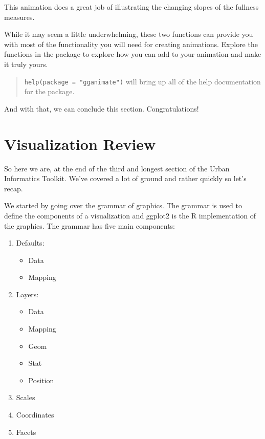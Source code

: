 \documentclass[
]{book}
\providecommand{\tightlist}{%
  \setlength{\itemsep}{0pt}\setlength{\parskip}{0pt}}
\begin{document}
This animation does a great job of illustrating the changing slopes of the fullness measures.

While it may seem a little underwhelming, these two functions can provide you with most of the functionality you will need for creating animations. Explore the functions in the package to explore how you can add to your animation and make it truly yours.

\begin{quote}
\texttt{help(package\ =\ "gganimate")} will bring up all of the help documentation for the package.
\end{quote}

And with that, we can conclude this section. Congratulations!

\hypertarget{visualization-review}{%
\chapter{Visualization Review}\label{visualization-review}}

So here we are, at the end of the third and longest section of the Urban Informatics Toolkit. We've covered a lot of ground and rather quickly so let's recap.

We started by going over the grammar of graphics. The grammar is used to define the components of a visualization and ggplot2 is the R implementation of the graphics. The grammar has five main components:

\begin{enumerate}
\def\labelenumi{\arabic{enumi}.}
\tightlist
\item
  Defaults:

  \begin{itemize}
  \tightlist
  \item
    Data
  \item
    Mapping
  \end{itemize}
\item
  Layers:

  \begin{itemize}
  \tightlist
  \item
    Data
  \item
    Mapping
  \item
    Geom
  \item
    Stat
  \item
    Position
  \end{itemize}
\item
  Scales
\item
  Coordinates
\item
  Facets
\end{enumerate}
\end{document}
